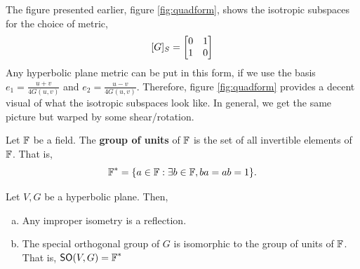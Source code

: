 \begin{remark*}
    The figure presented earlier, figure \ref{fig:quadform}, shows the isotropic subspaces for the choice of metric,
    \[[G]_S = \begin{bmatrix}0&1\\1&0\end{bmatrix}\]
    Any hyperbolic plane metric can be put in this form, if we use the basis $e_1 = \frac{u+v}{4G(u,v)}$ and $e_2 = \frac{u-v}{4G(u,v)}$. Therefore, figure \ref{fig:quadform} provides a decent visual of what the isotropic subspaces look like. In general, we get the same picture but warped by some shear/rotation.
\end{remark*}
\begin{defn}
    Let $\operatorname{\mathbb{F}}$ be a field. The \textbf{group of units} of $\operatorname{\mathbb{F}}$ is the set of all invertible elements of $\operatorname{\mathbb{F}}$. That is, 
    \begin{equation}\operatorname{\mathbb{F}}^* = \{a \in \operatorname{\mathbb{F}}: \exists b \in \operatorname{\mathbb{F}}, ba=ab=1\}.\end{equation}
\end{defn}
\begin{thm}
    Let $V,G$ be a hyperbolic plane. Then,
    \begin{enumerate}[a)]
    \item {
    Any improper isometry is a reflection.
    }
    \item {
    The special orthogonal group of $G$ is isomorphic to the group of units of $\operatorname{\mathbb{F}}$. That is, $\operatorname{\textsf{SO}}(V,G) = \operatorname{\mathbb{F}}^*$
    }
    \end{enumerate}
\end{thm}
